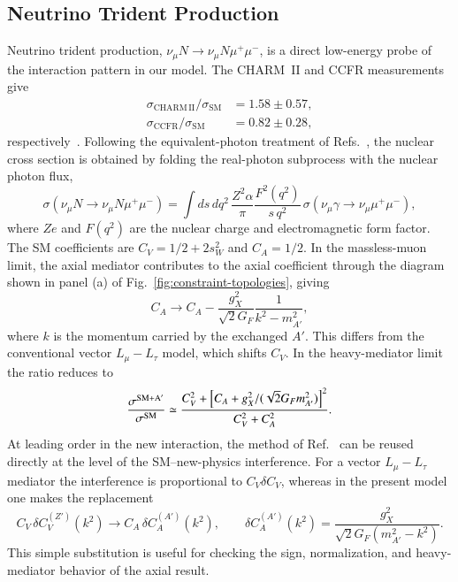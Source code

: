 \documentclass[onecolumn, aps, nofootinbib, prd, preprint, floats, floatfix, amsmath, amssymb, superscriptaddress, preprintnumbers]{revtex4-2}
\begin{document}
\subsection{Neutrino Trident Production}
\label{subsec:trident}
Neutrino trident production, $\nu_\mu N\to \nu_\mu N\mu^+\mu^-$, is a direct low-energy probe of the interaction pattern in our model. The CHARM~II and CCFR measurements give
\begin{equation}
\begin{aligned}
\sigma_{\mathrm{CHARM\,II}}/\sigma_{\mathrm{SM}}&=1.58\pm0.57,\\
\sigma_{\mathrm{CCFR}}/\sigma_{\mathrm{SM}}&=0.82\pm0.28,
\end{aligned}
\end{equation}
respectively~\cite{geiregat1990first,CCFR:1991lpl}. Following the equivalent-photon treatment of Refs.~\cite{Williams:1934ad,Belusevic:1987cw,Altmannshofer:2014pba}, the nuclear cross section is obtained by folding the real-photon subprocess with the nuclear photon flux,
\begin{equation}
\sigma(\nu_\mu N\to\nu_\mu N\mu^+\mu^-)
=\int ds\,dq^2\,
\frac{Z^2\alpha}{\pi}\frac{F^2(q^2)}{s\,q^2}\,
\sigma(\nu_\mu\gamma\to\nu_\mu\mu^+\mu^-),
\label{eq:trident-epa}
\end{equation}
where $Ze$ and $F(q^2)$ are the nuclear charge and electromagnetic form factor. The SM coefficients are $C_V=1/2+2s_W^2$ and $C_A=1/2$. In the massless-muon limit, the axial mediator contributes to the axial coefficient through the diagram shown in panel (a) of Fig.~\ref{fig:constraint-topologies}, giving
\begin{equation}
C_A\longrightarrow C_A-\frac{g_X^2}{\sqrt2G_F}\frac{1}{k^2-m_{A'}^2},
\end{equation}
where $k$ is the momentum carried by the exchanged $A'$. This differs from the conventional vector $L_\mu-L_\tau$ model, which shifts $C_V$. In the heavy-mediator limit the ratio reduces to
\begin{equation}
\frac{\sigma^{\rm SM+A'}}{\sigma^{\rm SM}}
\simeq
\frac{C_V^2+\left[C_A+g_X^2/(\sqrt2G_Fm_{A'}^2)\right]^2}
{C_V^2+C_A^2}.
\end{equation}
At leading order in the new interaction, the method of Ref.~\cite{Altmannshofer:2014pba} can be reused directly at the level of the SM--new-physics interference. For a vector $L_\mu-L_\tau$ mediator the interference is proportional to $C_V\delta C_V$, whereas in the present model one makes the replacement
\begin{equation}
C_V\,\delta C_V^{(Z')}(k^2)
\longrightarrow
C_A\,\delta C_A^{(A')}(k^2),
\qquad
\delta C_A^{(A')}(k^2)=
\frac{g_X^2}{\sqrt2G_F\left(m_{A'}^2-k^2\right)}.
\label{eq:trident-leading-substitution}
\end{equation}
This simple substitution is useful for checking the sign, normalization, and heavy-mediator behavior of the axial result.
\end{document}
